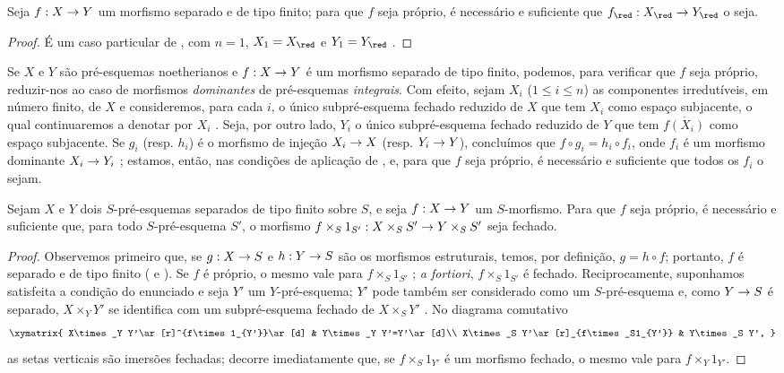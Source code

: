 \documentclass[oneside,10pt]{amsart}
\makeatletter
\renewcommand{\leq}{\leqslant}
\newcommand{\ega@arrow}[2]{\mathchoice{#1}{#2}{#2}{#2}}
\renewcommand{\to}{\ega@arrow{\longrightarrow}{\rightarrow}}
\let\EGAOriginalLabel\label
\renewcommand{\label}[1]{\phantomsection\EGAOriginalLabel{#1}}
\makeatother
\begin{document}
\begin{corollary}[5.4.6]
\label{II.5.4.6}
Seja $f:X\to Y$ um morfismo separado e de tipo finito; para que $f$ seja próprio, é necessário e suficiente que $f_\red:X_\red\to Y_\red$ o seja.
\end{corollary}

\begin{proof}
É um caso particular de , com $n=1$, $X_1=X_\red$ e $Y_1=Y_\red$ .
\end{proof}

\begin{env}[5.4.7]
\label{II.5.4.7}
Se $X$ e $Y$ são pré-esquemas noetherianos e $f:X\to Y$ é um morfismo separado de tipo finito, podemos, para verificar que $f$ seja próprio, reduzir-nos ao caso de morfismos \emph{dominantes} de pré-esquemas \emph{integrais}.
Com efeito, sejam $X_i$ ($1\leq i\leq n$) as componentes irredutíveis, em número finito, de $X$ e consideremos, para cada $i$, o único subpré-esquema fechado reduzido de $X$ que tem $X_i$ como espaço subjacente, o qual continuaremos a denotar por $X_i$ .
Seja, por outro lado, $Y_i$ o único subpré-esquema fechado reduzido de $Y$ que tem $\overline{f(X_i)}$ como espaço subjacente.
Se $g_i$ (resp. $h_i$) é o morfismo de injeção $X_i\to X$ (resp. $Y_i\to Y$), concluímos que $f\circ g_i=h_i\circ f_i$, onde $f_i$ é um morfismo dominante $X_i\to Y_i$ ;
estamos, então, nas condições de aplicação de , e, para que $f$ seja próprio, é necessário e suficiente que todos os $f_i$ o sejam.
\end{env}

\begin{corollary}[5.4.8]
\label{II.5.4.8}
Sejam $X$ e $Y$ dois $S$-pré-esquemas separados de tipo finito sobre $S$, e seja $f:X\to Y$ um $S$-morfismo.
Para que $f$ seja próprio, é necessário e suficiente que, para todo $S$-pré-esquema $S'$, o morfismo $f\times_S 1_{S'}:X\times_S S'\to Y\times_S S'$ seja fechado.
\end{corollary}

\begin{proof}
Observemos primeiro que, se $g:X\to S$ e $h:Y\to S$ são os morfismos estruturais, temos, por definição, $g=h\circ f$; portanto, $f$ é separado e de tipo finito ( e ).
Se $f$ é próprio, o mesmo vale para $f\times_S 1_{S'}$ ; \emph{a fortiori}, $f\times_S 1_{S'}$ é fechado.
Reciprocamente, suponhamos satisfeita a condição do enunciado e seja $Y'$ um $Y$-pré-esquema;
$Y'$ pode também ser considerado como um $S$-pré-esquema e, como $Y\to S$ é separado, $X\times_Y Y'$ se identifica com um subpré-esquema fechado de $X\times_S Y'$ .
No diagrama comutativo
\[
  \xymatrix{
    X\times_Y Y'\ar[r]^{f\times1_{Y'}}\ar[d] &
    Y\times_Y Y'=Y'\ar[d]\\
    X\times_S Y'\ar[r]_{f\times_S1_{Y'}} &
    Y\times_S Y',
  }
\]
as setas verticais são imersões fechadas; decorre imediatamente que, se $f\times_S1_{Y'}$ é um morfismo fechado, o mesmo vale para $f\times_Y1_{Y'}$.
\end{proof}
\end{document}

